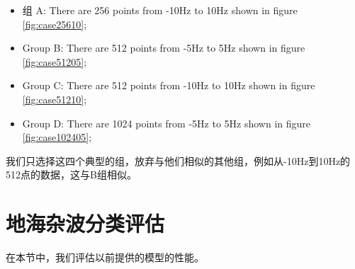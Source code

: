 \begin{itemize}
	\item 组 A: There are 256 points from -10Hz to 10Hz shown in figure \ref{fig:case25610};
	\item Group B: There are 512 points from -5Hz to 5Hz shown in figure \ref{fig:case51205};
	\item Group C: There are 512 points from -10Hz to 10Hz shown in figure \ref{fig:case51210};
	\item Group D: There are 1024 points from -5Hz to 5Hz shown in figure \ref{fig:case102405};
\end{itemize}

我们只选择这四个典型的组，放弃与他们相似的其他组，例如从-10Hz到10Hz的512点的数据，这与B组相似。




\section{地海杂波分类评估}
在本节中，我们评估以前提供的模型的性能。

